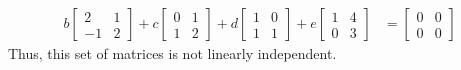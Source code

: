 \begin{enumerate}
\begin{align*}
b\begin{bmatrix} 2 & 1\\-1 & 2 \end{bmatrix} +
c \begin{bmatrix} 0 & 1 \\ 1 & 2\end{bmatrix} +
d \begin{bmatrix} 1 & 0 \\ 1 & 1 \end{bmatrix} +
e \begin{bmatrix} 1 & 4 \\ 0 & 3 \end{bmatrix}
&=
\begin{bmatrix} 0 & 0 \\ 0 & 0 \end{bmatrix}
\end{align*}
%
Thus, this set of matrices is not linearly independent.
%
\end{enumerate}